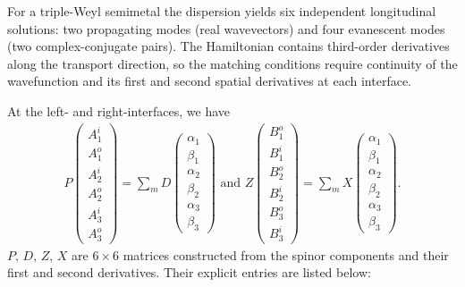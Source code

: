 \documentclass[aps,prb,onecolumn,longbibliography,nofootinbib,citeautoscript,10pt]{revtex4-2}
\begin{document}
For a triple-Weyl semimetal the dispersion yields six independent longitudinal solutions: two propagating modes (real wavevectors) and four evanescent modes (two complex-conjugate pairs). The Hamiltonian contains third-order derivatives along the transport direction, so the matching conditions require continuity of the wavefunction and its first and second spatial derivatives at each interface.

At the left- and right-interfaces, we have
\begin{align}
P\begin{pmatrix} A_1^i\\
A_1^o\\
A_2^i\\
A_2^o\\
A_3^i\\
A_3^o
\end{pmatrix}= \sum_m D\begin{pmatrix}
\alpha_1\\
\beta_1\\
\alpha_2\\
\beta_2\\
\alpha_3\\
\beta_3 \end{pmatrix} \text{ and }
Z \begin{pmatrix}
B_1^o\\
B_1^i\\
B_2^o\\
B_2^i\\
B_3^o\\ B_3^i \end{pmatrix}
=\sum_m X \begin{pmatrix}
\alpha_1\\
\beta_1\\
\alpha_2\\
\beta_2\\
\alpha_3\\
\beta_3 \end{pmatrix}.
\end{align}
$P,\, D,\, Z,\, X$ are $6\times6$ matrices constructed from the spinor components and their first and second derivatives. Their explicit entries are listed below:
\end{document}

